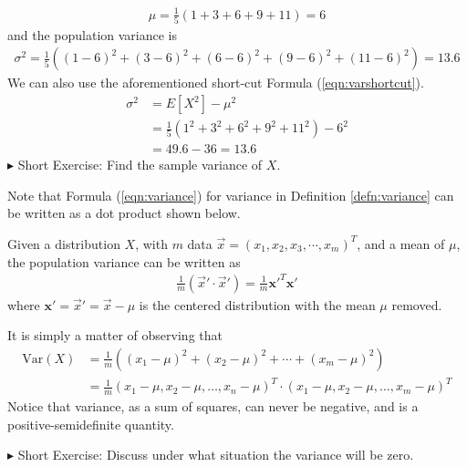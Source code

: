 \begin{align*}
\mu = \frac{1}{5}(1 + 3 + 6 + 9 + 11) = 6
\end{align*}
and the population variance is
\begin{align*}
\sigma^2 = \frac{1}{5}((1-6)^2 + (3-6)^2 + (6-6)^2 + (9-6)^2 + (11-6)^2) = 13.6
\end{align*}
We can also use the aforementioned short-cut Formula (\ref{eqn:varshortcut}).
\begin{align*}
\sigma^2 &= E[X^2] - \mu^2 \\
&= \frac{1}{5} (1^2 + 3^2 + 6^2 + 9^2 + 11^2) - 6^2 \\
&= 49.6 - 36 = 13.6
\end{align*}
$\blacktriangleright$ Short Exercise: Find the sample variance of $X$.\footnotemark\par
Note that Formula (\ref{eqn:variance}) for variance in Definition \ref{defn:variance} can be written as a dot product shown below.
\begin{proper}
Given a distribution $X$, with $m$ data $\vec{x} = (x_1, x_2, x_3, \cdots, x_m)^T$, and a mean of $\mu$, the population variance can be written as
\begin{align}
\frac{1}{m} (\vec{x}'\cdot\vec{x}') = \frac{1}{m} \textbf{x}'^T \textbf{x}'
\end{align}
where $\textbf{x}' = \vec{x}' = \vec{x} - \mu$ is the centered distribution with the mean $\mu$ removed.
\end{proper}
It is simply a matter of observing that 
\begin{align*}
\text{Var}(X) &= \frac{1}{m} ((x_1 - \mu)^2 + (x_2 - \mu)^2 + \cdots + (x_m - \mu)^2) \\ &= \frac{1}{m} (x_1 - \mu, x_2 - \mu, \ldots, x_n - \mu)^T \cdot (x_1 - \mu, x_2 - \mu, \ldots, x_m - \mu)^T    
\end{align*}
Notice that variance, as a sum of squares, can never be negative, and is a positive-semidefinite quantity. \par
$\blacktriangleright$ Short Exercise: Discuss under what situation the variance will be zero.\footnotemark

